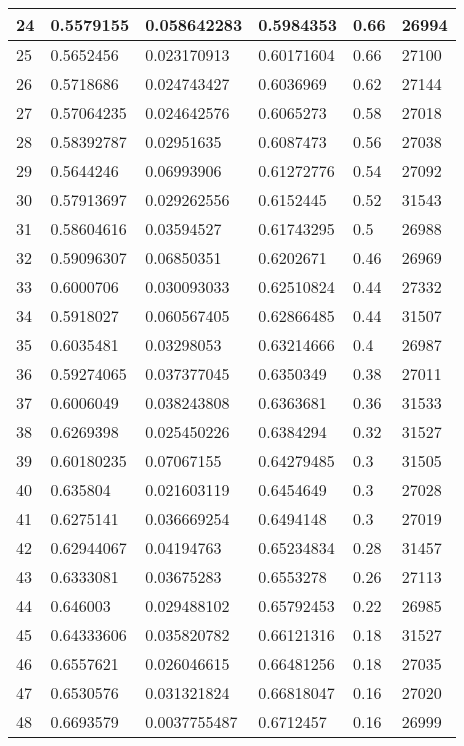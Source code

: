 \begin{longtable}{|l|l|l|l|l|l|}
24 & 0.5579155 & 0.058642283 & 0.5984353 & 0.66 & 26994 \\ \hline 
25 & 0.5652456 & 0.023170913 & 0.60171604 & 0.66 & 27100 \\ \hline 
26 & 0.5718686 & 0.024743427 & 0.6036969 & 0.62 & 27144 \\ \hline 
27 & 0.57064235 & 0.024642576 & 0.6065273 & 0.58 & 27018 \\ \hline 
28 & 0.58392787 & 0.02951635 & 0.6087473 & 0.56 & 27038 \\ \hline 
29 & 0.5644246 & 0.06993906 & 0.61272776 & 0.54 & 27092 \\ \hline 
30 & 0.57913697 & 0.029262556 & 0.6152445 & 0.52 & 31543 \\ \hline 
31 & 0.58604616 & 0.03594527 & 0.61743295 & 0.5 & 26988 \\ \hline 
32 & 0.59096307 & 0.06850351 & 0.6202671 & 0.46 & 26969 \\ \hline 
33 & 0.6000706 & 0.030093033 & 0.62510824 & 0.44 & 27332 \\ \hline 
34 & 0.5918027 & 0.060567405 & 0.62866485 & 0.44 & 31507 \\ \hline 
35 & 0.6035481 & 0.03298053 & 0.63214666 & 0.4 & 26987 \\ \hline 
36 & 0.59274065 & 0.037377045 & 0.6350349 & 0.38 & 27011 \\ \hline 
37 & 0.6006049 & 0.038243808 & 0.6363681 & 0.36 & 31533 \\ \hline 
38 & 0.6269398 & 0.025450226 & 0.6384294 & 0.32 & 31527 \\ \hline 
39 & 0.60180235 & 0.07067155 & 0.64279485 & 0.3 & 31505 \\ \hline 
40 & 0.635804 & 0.021603119 & 0.6454649 & 0.3 & 27028 \\ \hline 
41 & 0.6275141 & 0.036669254 & 0.6494148 & 0.3 & 27019 \\ \hline 
42 & 0.62944067 & 0.04194763 & 0.65234834 & 0.28 & 31457 \\ \hline 
43 & 0.6333081 & 0.03675283 & 0.6553278 & 0.26 & 27113 \\ \hline 
44 & 0.646003 & 0.029488102 & 0.65792453 & 0.22 & 26985 \\ \hline 
45 & 0.64333606 & 0.035820782 & 0.66121316 & 0.18 & 31527 \\ \hline 
46 & 0.6557621 & 0.026046615 & 0.66481256 & 0.18 & 27035 \\ \hline 
47 & 0.6530576 & 0.031321824 & 0.66818047 & 0.16 & 27020 \\ \hline 
48 & 0.6693579 & 0.0037755487 & 0.6712457 & 0.16 & 26999 \\ \hline 

\end{longtable}
